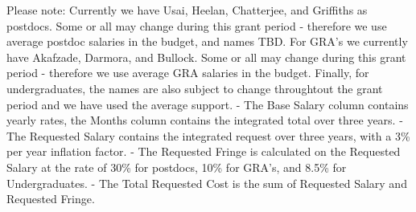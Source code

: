 \documentclass[11pt]{article}
\begin{document}
Please note: Currently we have Usai, Heelan, Chatterjee, and Griffiths as postdocs. Some or all may change during this grant 
period - therefore we use average postdoc salaries in the budget, and names TBD. For GRA's we currently have 
Akafzade,  Darmora, and Bullock. Some or all may change during this grant period - therefore we use average GRA salaries in the budget.
Finally, for undergraduates, the names are also subject to change throughtout the grant period and we have 
used the average support.
- The Base Salary column contains yearly rates, the Months column contains the integrated total over three years.
- The Requested Salary contains the integrated request over three years, with a 3\% per year inflation factor.
- The Requested Fringe is calculated on the Requested Salary at the rate of 30\% for postdocs, 10\% for GRA's,
  and 8.5\% for Undergraduates.
- The Total Requested Cost is the sum of Requested Salary and Requested Fringe.
\end{document}
